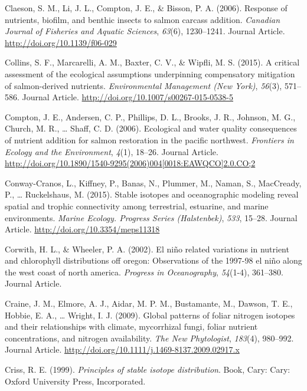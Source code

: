 \documentclass [11pt, proquest] {uwthesis}[2015/03/03]
\begin{document}
\hypertarget{ref-Claeson2006}{}
Claeson, S. M., Li, J. L., Compton, J. E., \& Bisson, P. A. (2006).
Response of nutrients, biofilm, and benthic insects to salmon carcass
addition. \emph{Canadian Journal of Fisheries and Aquatic Sciences},
\emph{63}(6), 1230--1241. Journal Article.
\url{http://doi.org/10.1139/f06-029}

\hypertarget{ref-Collins2015}{}
Collins, S. F., Marcarelli, A. M., Baxter, C. V., \& Wipfli, M. S.
(2015). A critical assessment of the ecological assumptions underpinning
compensatory mitigation of salmon-derived nutrients. \emph{Environmental
Management (New York)}, \emph{56}(3), 571--586. Journal Article.
\url{http://doi.org/10.1007/s00267-015-0538-5}

\hypertarget{ref-Compton2006}{}
Compton, J. E., Andersen, C. P., Phillips, D. L., Brooks, J. R.,
Johnson, M. G., Church, M. R., \ldots{} Shaff, C. D. (2006). Ecological
and water quality consequences of nutrient addition for salmon
restoration in the pacific northwest. \emph{Frontiers in Ecology and the
Environment}, \emph{4}(1), 18--26. Journal Article.
\href{http://doi.org/10.1890/1540-9295(2006)004\%5B0018:EAWQCO\%5D2.0.CO;2}{http://doi.org/10.1890/1540-9295(2006)004{[}0018:EAWQCO{]}2.0.CO;2}

\hypertarget{ref-Conway2015}{}
Conway-Cranos, L., Kiffney, P., Banas, N., Plummer, M., Naman, S.,
MacCready, P., \ldots{} Ruckelshaus, M. (2015). Stable isotopes and
oceanographic modeling reveal spatial and trophic connectivity among
terrestrial, estuarine, and marine environments. \emph{Marine Ecology.
Progress Series (Halstenbek)}, \emph{533}, 15--28. Journal Article.
\url{http://doi.org/10.3354/meps11318}

\hypertarget{ref-Corwith2002}{}
Corwith, H. L., \& Wheeler, P. A. (2002). El niño related variations in
nutrient and chlorophyll distributions off oregon: Observations of the
1997-98 el niño along the west coast of north america. \emph{Progress in
Oceanography}, \emph{54}(1-4), 361--380. Journal Article.

\hypertarget{ref-Craine2009}{}
Craine, J. M., Elmore, A. J., Aidar, M. P. M., Bustamante, M., Dawson,
T. E., Hobbie, E. A., \ldots{} Wright, I. J. (2009). Global patterns of
foliar nitrogen isotopes and their relationships with climate,
mycorrhizal fungi, foliar nutrient concentrations, and nitrogen
availability. \emph{The New Phytologist}, \emph{183}(4), 980--992.
Journal Article. \url{http://doi.org/10.1111/j.1469-8137.2009.02917.x}

\hypertarget{ref-Criss1999}{}
Criss, R. E. (1999). \emph{Principles of stable isotope distribution}.
Book, Cary: Cary: Oxford University Press, Incorporated.
\end{document}
